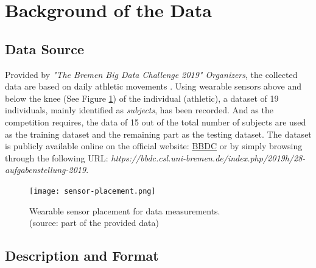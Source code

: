 %
%
%
%
%
%


\section{Background of the Data}
\subsection{Data Source}

Provided by \emph{"The Bremen Big Data Challenge 2019" Organizers}, the collected data are based on
daily athletic movements \parencite{bbdc}. Using wearable sensors above and below the knee (See
Figure \ref{fig:sensor-placement}) of the individual (athletic), a dataset of 19 individuals, mainly
identified as \emph{subjects}, has been recorded. And as the competition requires, the data of 15
out of the total number of subjects are used as the training dataset and the remaining part as the
testing dataset. The dataset is publicly available online on the official website:
\href{https://bbdc.csl.uni-bremen.de/images/2019/bbdc_2019_Bewegungsdaten_mit_referenz.zip}{BBDC} or
by simply browsing through the following URL: \emph{https://bbdc.csl.uni-bremen.de/index.php/2019h/28-aufgabenstellung-2019}.

\begin{figure}
    \centering
    \texttt{[image: sensor-placement.png]}
    \caption{Wearable sensor placement for data measurements. \\ (source: part of the provided data)}
    \label{fig:sensor-placement}
\end{figure}

\subsection{Description and Format}

